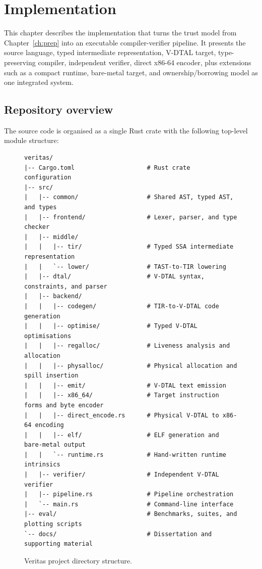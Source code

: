 \chapter{Implementation}\label{ch:impl}

This chapter describes the implementation that turns the trust model from Chapter~\ref{ch:prep} into an executable compiler-verifier pipeline. It presents the source language, typed intermediate representation, V-DTAL target, type-preserving compiler, independent verifier, direct x86-64 encoder, plus extensions such as a compact runtime, bare-metal target, and ownership/borrowing model as one integrated system.

\section{Repository overview}\label{sec:repo-overview}
%
The source code is organised as a single Rust crate with the following top-level module structure:
%
\begin{figure}[h]
  \centering
\footnotesize
\begin{verbatim}
veritas/
|-- Cargo.toml                    # Rust crate configuration
|-- src/
|   |-- common/                   # Shared AST, typed AST, and types
|   |-- frontend/                 # Lexer, parser, and type checker
|   |-- middle/
|   |   |-- tir/                  # Typed SSA intermediate representation
|   |   `-- lower/                # TAST-to-TIR lowering
|   |-- dtal/                     # V-DTAL syntax, constraints, and parser
|   |-- backend/
|   |   |-- codegen/              # TIR-to-V-DTAL code generation
|   |   |-- optimise/             # Typed V-DTAL optimisations
|   |   |-- regalloc/             # Liveness analysis and allocation
|   |   |-- physalloc/            # Physical allocation and spill insertion
|   |   |-- emit/                 # V-DTAL text emission
|   |   |-- x86_64/               # Target instruction forms and byte encoder
|   |   |-- direct_encode.rs      # Physical V-DTAL to x86-64 encoding
|   |   |-- elf/                  # ELF generation and bare-metal output
|   |   `-- runtime.rs            # Hand-written runtime intrinsics
|   |-- verifier/                 # Independent V-DTAL verifier
|   |-- pipeline.rs               # Pipeline orchestration
|   `-- main.rs                   # Command-line interface
|-- eval/                         # Benchmarks, suites, and plotting scripts
`-- docs/                         # Dissertation and supporting material
\end{verbatim}
  \caption{Veritas project directory structure.}
  \label{fig:repo}
\end{figure}

